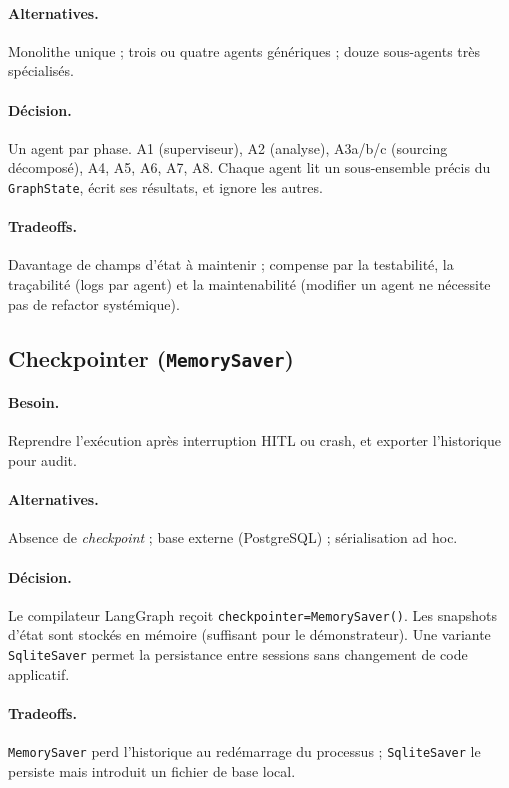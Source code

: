 \paragraph{Alternatives.} Monolithe unique ; trois ou quatre agents génériques ; douze sous-agents très spécialisés.

\paragraph{Décision.} Un agent par phase. A1 (superviseur), A2 (analyse), A3a/b/c (sourcing décomposé), A4, A5, A6, A7, A8. Chaque agent lit un sous-ensemble précis du \texttt{GraphState}, écrit ses résultats, et ignore les autres.

\paragraph{Tradeoffs.} Davantage de champs d'état à maintenir ; compense par la testabilité, la traçabilité (logs par agent) et la maintenabilité (modifier un agent ne nécessite pas de refactor systémique).

\subsection{Checkpointer (\texttt{MemorySaver})}

\paragraph{Besoin.} Reprendre l'exécution après interruption HITL ou crash, et exporter l'historique pour audit.

\paragraph{Alternatives.} Absence de \textit{checkpoint} ; base externe (PostgreSQL) ; sérialisation ad hoc.

\paragraph{Décision.} Le compilateur LangGraph reçoit \texttt{checkpointer=MemorySaver()}. Les snapshots d'état sont stockés en mémoire (suffisant pour le démonstrateur). Une variante \texttt{SqliteSaver} permet la persistance entre sessions sans changement de code applicatif.

\paragraph{Tradeoffs.} \texttt{MemorySaver} perd l'historique au redémarrage du processus ; \texttt{SqliteSaver} le persiste mais introduit un fichier de base local.

